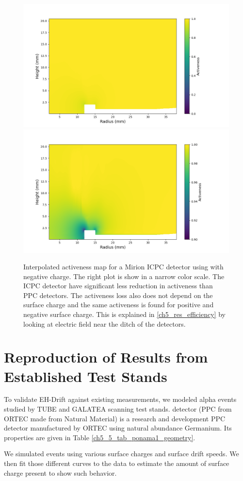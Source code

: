 \begin{figure}%
\centering
\includegraphics[trim={1.5cm 0cm 3.3cm 1cm},clip,width=0.49\linewidth]{ch5/figs/activeness_map_cubic_sc=-0.3_V07647A_2039_linear_full.png}
\includegraphics[trim={1.5cm 0cm 3.3cm 1cm},clip,width=0.49\linewidth]{ch5/figs/activeness_map_cubic_sc=-0.3_V07647A_2039_linear.png}

\caption{Interpolated activeness map for a Mirion ICPC detector using \ehd with negative charge. The right plot is show in a narrow color scale. The ICPC detector have significant less reduction in activeness than PPC detectors. The activeness loss also does not depend on the surface charge and the same activeness is found for positive and negative surface charge. This is explained in \ref{ch5_res_efficiency} by looking at electric field near the ditch of the detectors.}
\label{ch5_fig_interpolated_icpc_activeness_map}
\end{figure}


\section{\label{res:1} Reproduction of Results from Established Test Stands}

To validate EH-Drift against existing measurements, we modeled alpha events studied by TUBE and GALATEA scanning test stands. {\ponama} detector (PPC from ORTEC made from Natural Material) is a research and development PPC detector manufactured by ORTEC using natural abundance Germanium. Its properties are given in Table \ref{ch5_5_tab_ponama1_geometry}.



We simulated events using various surface charges and surface drift speeds.  We then fit those different curves to the data to estimate the amount of surface charge present to show such behavior.

